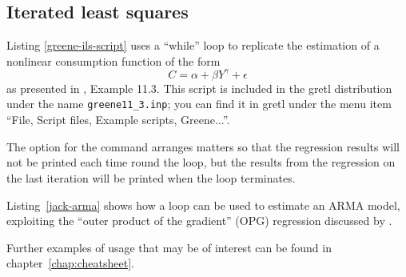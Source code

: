 \subsection{Iterated least squares}
\label{loop-ils-examples}

Listing \ref{greene-ils-script} uses a ``while'' loop to replicate the
estimation of a nonlinear consumption function of the form
\[ C = \alpha + \beta Y^{\gamma} + \epsilon \]
as presented in \cite{greene00}, Example 11.3.  This script is included
in the gretl distribution under the name \verb+greene11_3.inp+;
you can find it in gretl under the menu item ``File, Script files,
Example scripts, Greene...''.

The option  for the  command arranges
matters so that the regression results will not be printed each time
round the loop, but the results from the regression on the last
iteration will be printed when the loop terminates.

\begin{script}[htbp]
  \label{greene-ils-script}
\end{script}

Listing~\ref{jack-arma} shows how a loop can be used to estimate an
ARMA model, exploiting the ``outer product of the gradient'' (OPG)
regression discussed by \cite{davidson-mackinnon93}.

Further examples of  usage that may be of interest can be
found in chapter~\ref{chap:cheatsheet}.

